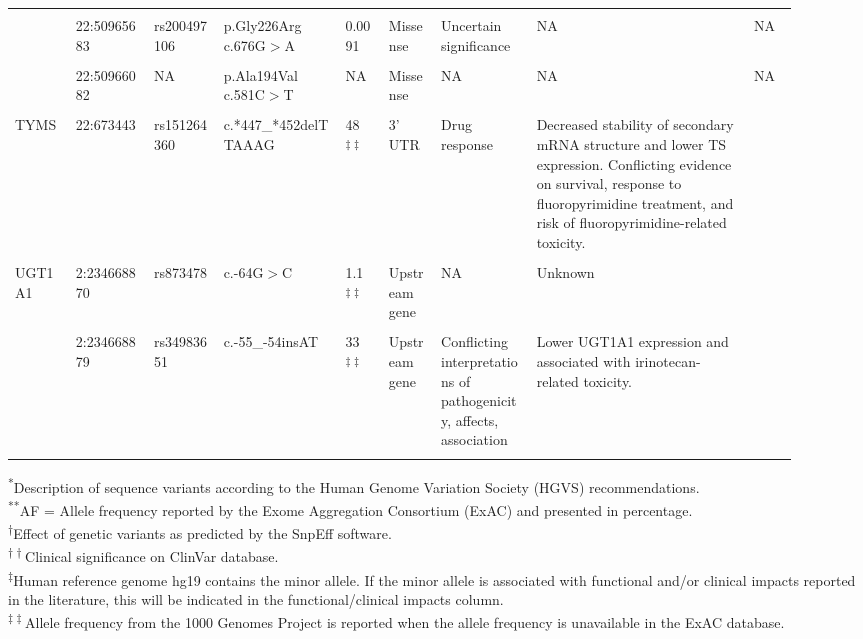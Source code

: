 \begin{landscape}
\begin{longtable}{p{0.07\linewidth}|p{0.09\linewidth}p{0.085\linewidth}p{0.14\linewidth}p{0.05\linewidth}p{0.065\linewidth}p{0.11\linewidth}p{0.25\linewidth}p{0.05\linewidth}}
	\\
	\\
	& 22:50965683 & rs200497106 & p.Gly226Arg c.676G$>$A & 0.0091 & Missense & Uncertain \mbox{significance} & NA & NA
	\\
	\\
	& 22:50966082 & NA & p.Ala194Val c.581C$>$T & NA & Missense & NA & NA & NA
	\\
	\\
	\hline
	TYMS & 22:673443 & rs151264360 & \footnotesize{c.*447\_*452delTTAAAG} & 48\textsuperscript{$\ddagger\ddagger$} & 3' UTR & Drug response & Decreased stability of secondary mRNA structure and lower TS expression. Conflicting evidence on survival, response to fluoropyrimidine treatment, and risk of fluoropyrimidine-related toxicity. & \cite{Gusella2006, Mandola2004, Graziano2008, Afzal2011, Dotor2006, Stoehlmacher2004}
	\\
	\\
	\hline
	UGT1A1 & 2:234668870 & rs873478 & c.-64G$>$C & 1.1\textsuperscript{$\ddagger\ddagger$} & Upstream gene & NA & Unknown & \cite{Cheli2015, Yea2008, Zhang2012}
	\\
	\\
	& 2:234668879 & rs34983651 & c.-55\_-54insAT & 33\textsuperscript{$\ddagger\ddagger$} & Upstream gene & Conflicting \mbox{interpretations} of \mbox{pathogenicity}, affects, \mbox{association} & Lower UGT1A1 expression and associated with irinotecan-related toxicity. & \cite{Toffoli2006, Rouits2008, McLeod2010, Marcuello2004, Ando2000, Innocenti2004, Glimelius2011, Ruzzo2008, DeJong2006, Kweekel2008}
	\\
	\\
	\hline
\end{longtable}

\newpage
\noindent\textsuperscript{*}Description of sequence variants according to the Human Genome Variation Society (HGVS) recommendations.
\\
\textsuperscript{**}AF = Allele frequency reported by the Exome Aggregation Consortium (ExAC) and presented in percentage.
\\
\textsuperscript{$\dagger$}Effect of genetic variants as predicted by the SnpEff software.
\\
\textsuperscript{$\dagger\dagger$}Clinical significance on ClinVar database.
\\
\textsuperscript{$\ddagger$}Human reference genome hg19 contains the minor allele. If the minor allele is associated with functional and/or clinical impacts reported in the literature, this will be indicated in the functional/clinical impacts column.
\\
\textsuperscript{$\ddagger\ddagger$}Allele frequency from the 1000 Genomes Project is reported when the allele frequency is unavailable in the ExAC database.
\\

\end{landscape}

